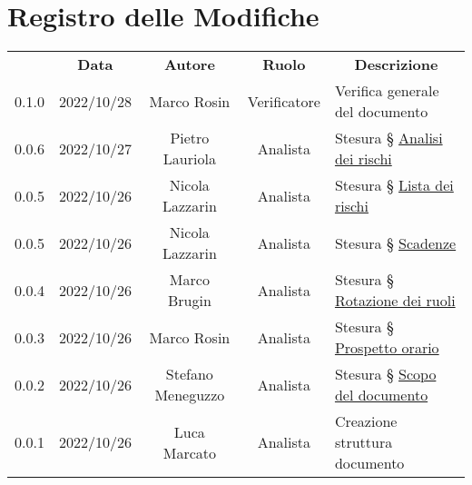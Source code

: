 \thispagestyle{empty}

\section*{Registro delle Modifiche}

\begin{center}
    \renewcommand{\arraystretch}{1.8}
    \begin{longtable}[c]{c | c | c | c | p{5cm}}
        \rowcolor[HTML]{444444}
        \multicolumn{1}{c}{\color[HTML]{FFFFFF} \textbf{Versione}} &
        \multicolumn{1}{c}{\color[HTML]{FFFFFF} \textbf{Data}}     &
        \multicolumn{1}{c}{\color[HTML]{FFFFFF} \textbf{Autore}}   &
        \multicolumn{1}{c}{\color[HTML]{FFFFFF} \textbf{Ruolo}}    &
        \multicolumn{1}{c}{\color[HTML]{FFFFFF} \textbf{Descrizione}}                                                                                                                       \\

        0.1.0                                                      & 2022/10/28 & Marco Rosin       & Verificatore & {\small Verifica generale del documento}                               \\ \hline
        0.0.6                                                      & 2022/10/27 & Pietro Lauriola   & Analista     & Stesura § \hyperref[section:analisi_rischi]{\small Analisi dei rischi} \\ \hline
        0.0.5                                                      & 2022/10/26 & Nicola Lazzarin   & Analista     & Stesura § \hyperref[section:lista_rischi]{\small Lista dei rischi} \\ \hline      
        0.0.5                                                      & 2022/10/26 & Nicola Lazzarin   & Analista     & Stesura § \hyperref[section:scadenze]{Scadenze}                        \\ \hline
        0.0.4                                                      & 2022/10/26 & Marco Brugin      & Analista     & Stesura § \hyperref[section:rotazione_ruoli]{Rotazione dei ruoli}      \\ \hline
        0.0.3                                                      & 2022/10/26 & Marco Rosin       & Analista     & Stesura § \hyperref[section:prospetto_orario]{Prospetto orario}        \\ \hline
        0.0.2                                                      & 2022/10/26 & Stefano Meneguzzo & Analista     & Stesura § \hyperref[section:introduzione]{\small Scopo del documento}  \\ \hline
        0.0.1                                                      & 2022/10/26 & Luca Marcato      & Analista     & {\small Creazione struttura documento}                                 \\
    \end{longtable}
\end{center}